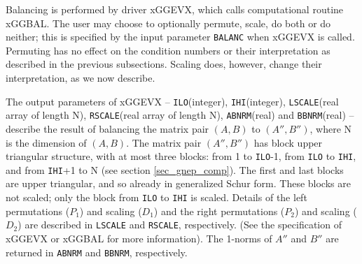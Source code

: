 Balancing is performed by driver xGGEVX, which calls computational
routine xGGBAL. The user may choose to optionally
permute, scale, do both or do neither;
this is specified by the input parameter
{\tt BALANC} when xGGEVX is called.
Permuting has no effect on the condition numbers
or their interpretation as described in the previous subsections. Scaling does,
however, change their interpretation, as we now describe.

The output parameters of xGGEVX --
{\tt ILO}(integer), {\tt IHI}(integer),
{\tt LSCALE}(real array of length N),
{\tt RSCALE}(real array of length N),
{\tt ABNRM}(real) and
{\tt BBNRM}(real) --
describe the result of balancing the matrix pair $(A, B)$ to
$(A'',B'')$, where N is the dimension of $(A,B)$.
The matrix pair $(A'',B'')$ has block upper triangular
structure, with at most three blocks: from 1 to {\tt ILO}-1,
from {\tt ILO} to {\tt IHI}, and from {\tt IHI}+1 to N (see section
\ref{sec_gnep_comp}). The first and last blocks are upper
triangular, and so already in generalized Schur form. These blocks are not
scaled; only the block from {\tt ILO} to {\tt IHI} is scaled.
Details of the left permutations ($P_1$) and scaling ($D_1$)
and the right permutations ($P_2$) and scaling ($D_2$)
are described in {\tt LSCALE} and {\tt RSCALE}, respectively.
(See the specification of xGGEVX or xGGBAL for more information).
The 1-norms of $A''$ and $B''$ are returned in
{\tt ABNRM} and {\tt BBNRM}, respectively.

